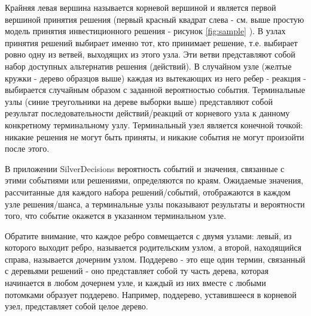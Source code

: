 Крайняя левая вершина называется корневой вершиной и является первой вершиной принятия решения (первый красный квадрат слева - см. выше простую модель принятия инвестиционного решения - рисунок \ref{fig:sample} ). В узлах принятия решений выбирает именно тот, кто принимает решение, т.е. выбирает ровно одну из ветвей, выходящих из этого узла. Эти ветви представляют собой набор доступных альтернатив решения (действий). В случайном узле (желтые кружки - дерево образцов выше) каждая из вытекающих из него ребер - реакция - выбирается случайным образом с заданной вероятностью события. Терминальные узлы (синие треугольники на дереве выборки выше) представляют собой результат последовательности действий/реакций от корневого узла к данному конкретному терминальному узлу. Терминальный узел является конечной точкой: никакие решения не могут быть приняты, и никакие события не могут произойти после этого.

В приложении SilverDecisions вероятность событий и значения, связанные с этими событиями или решениями, определяются по краям. Ожидаемые значения, рассчитанные для каждого набора решений/событий, отображаются в каждом узле решения/шанса, а терминальные узлы показывают результаты и вероятности того, что событие окажется в указанном терминальном узле.

Обратите внимание, что каждое ребро совмещается с двумя узлами: левый, из которого выходит ребро, называется родительским узлом, а второй, находящийся справа, называется дочерним узлом. Поддерево - это еще один термин, связанный с деревьями решений - оно представляет собой ту часть дерева, которая начинается в любом дочернем узле, и каждый из них вместе с любыми потомками образует поддерево. Например, поддерево, уставившееся в корневой узел, представляет собой целое дерево.




